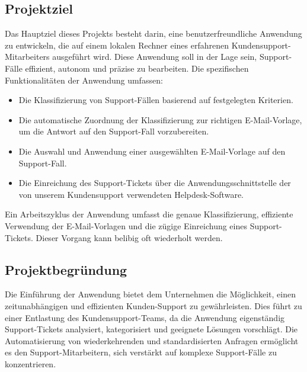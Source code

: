 \subsection{Projektziel} 
\label{sec:Projektziel}
Das Hauptziel dieses Projekts besteht darin, 
eine benutzerfreundliche Anwendung zu entwickeln,
die auf einem lokalen Rechner eines erfahrenen Kundensupport-Mitarbeiters ausgeführt wird. 
Diese Anwendung soll in der Lage sein, 
Support-Fälle effizient, autonom und präzise zu bearbeiten.
Die spezifischen Funktionalitäten der Anwendung umfassen:
\begin{itemize}
	\item Die Klassifizierung von Support-Fällen basierend auf festgelegten Kriterien.
	\item Die automatische Zuordnung der Klassifizierung zur richtigen E-Mail-Vorlage, um die Antwort auf den Support-Fall vorzubereiten.
	\item Die Auswahl und Anwendung einer ausgewählten E-Mail-Vorlage auf den Support-Fall.
	\item Die Einreichung des Support-Tickets über die Anwendungsschnittstelle der von unserem Kundensupport verwendeten Helpdesk-Software.
\end{itemize}
Ein Arbeitszyklus der Anwendung umfasst die genaue Klassifizierung, effiziente 
Verwendung der E-Mail-Vorlagen und die zügige Einreichung eines Support-Tickets.
Dieser Vorgang kann belibig oft wiederholt werden.

\subsection{Projektbegründung} 
Die Einführung der Anwendung bietet dem Unternehmen die Möglichkeit, 
einen zeitunabhängigen und effizienten Kunden-Support zu gewährleisten. 
Dies führt zu einer Entlastung des Kundensupport-Teams, da die Anwendung 
eigenständig Support-Tickets analysiert, kategorisiert und geeignete Lösungen vorschlägt. 
Die Automatisierung von wiederkehrenden und standardisierten 
Anfragen ermöglicht es den Support-Mitarbeitern, sich verstärkt
auf komplexe Support-Fälle zu konzentrieren.

